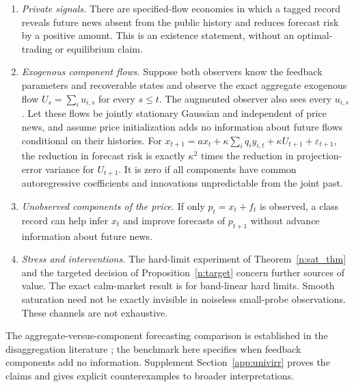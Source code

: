 \begin{proposition}\label{n:exc}
\begin{enumerate}[label=(\alph*),itemsep=1pt]
\item \emph{Private signals.} There are specified-flow economies in which a tagged record reveals future news absent from the public history and reduces forecast risk by a positive amount. This is an existence statement, without an optimal-trading or equilibrium claim.
\item \emph{Exogenous component flows.} Suppose both observers know the feedback parameters and recoverable states and observe the exact aggregate exogenous flow $U_s=\sum_i u_{i,s}$ for every $s\le t$. The augmented observer also sees every $u_{i,s}$. Let these flows be jointly stationary Gaussian and independent of price news, and assume price initialization adds no information about future flows conditional on their histories. For
$x_{t+1}=a x_t+\kappa\sum_iq_i y_{i,t}+\kappa U_{t+1}+\varepsilon_{t+1}$,
the reduction in forecast risk is exactly $\kappa^2$ times the reduction in projection-error variance for $U_{t+1}$. It is zero if all components have common autoregressive coefficients and innovations unpredictable from the joint past.
\item \emph{Unobserved components of the price.} If only $p_t=x_t+f_t$ is observed, a class record can help infer $x_t$ and improve forecasts of $p_{t+1}$ without advance information about future news.
\item \emph{Stress and interventions.} The hard-limit experiment of Theorem~\ref{n:sat_thm} and the targeted decision of Proposition~\ref{n:target} concern further sources of value. The exact calm-market result is for band-linear hard limits. Smooth saturation need not be exactly invisible in noiseless small-probe observations. These channels are not exhaustive.
\end{enumerate}
\end{proposition}

The aggregate-versus-component forecasting comparison is established in the disaggregation literature \citep{lutkepohl1987,hendry2011}; the benchmark here specifies when feedback components add no information. Supplement Section~\ref{app:univirr} proves the claims and gives explicit counterexamples to broader interpretations.

